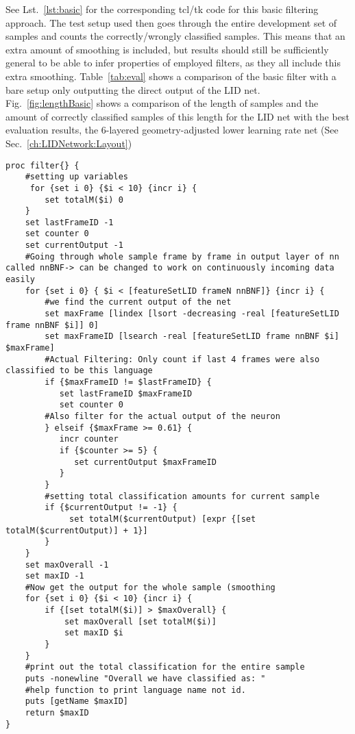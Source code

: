 See Lst.~\ref{lst:basic} for the corresponding tcl/tk code for this basic filtering approach. The test setup used then goes through the entire development set of samples and counts the correctly/wrongly classified samples. This means that an extra amount of smoothing is included, but results should still be sufficiently general to be able to infer properties of employed filters, as they all include this extra smoothing. Table~\ref{tab:eval} shows a comparison of the basic filter with a bare setup only outputting the direct output of the LID net. Fig.~\ref{fig:lengthBasic} shows a comparison of the length of samples and the amount of correctly classified samples of this length for the LID net with the best evaluation results, the 6-layered geometry-adjusted lower learning rate net (See Sec.~\ref{ch:LIDNetwork:Layout}) 
\begin{lstlisting}[label=lst:basic,caption=Most basic filter employed to smooth output]
proc filter{} {
    #setting up variables
     for {set i 0} {$i < 10} {incr i} {
        set totalM($i) 0
    }
    set lastFrameID -1
    set counter 0
    set currentOutput -1
    #Going through whole sample frame by frame in output layer of nn called nnBNF-> can be changed to work on continuously incoming data easily
    for {set i 0} { $i < [featureSetLID frameN nnBNF]} {incr i} {
        #we find the current output of the net
        set maxFrame [lindex [lsort -decreasing -real [featureSetLID frame nnBNF $i]] 0]
        set maxFrameID [lsearch -real [featureSetLID frame nnBNF $i] $maxFrame]
        #Actual Filtering: Only count if last 4 frames were also classified to be this language
        if {$maxFrameID != $lastFrameID} {
           set lastFrameID $maxFrameID
           set counter 0
        #Also filter for the actual output of the neuron
        } elseif {$maxFrame >= 0.61} {
           incr counter
           if {$counter >= 5} {
              set currentOutput $maxFrameID
           }
        }
        #setting total classification amounts for current sample
        if {$currentOutput != -1} {
             set totalM($currentOutput) [expr {[set totalM($currentOutput)] + 1}]
        }
    }
    set maxOverall -1
    set maxID -1
    #Now get the output for the whole sample (smoothing
    for {set i 0} {$i < 10} {incr i} {
        if {[set totalM($i)] > $maxOverall} {
            set maxOverall [set totalM($i)]
            set maxID $i
        }
    }
    #print out the total classification for the entire sample
    puts -nonewline "Overall we have classified as: "
    #help function to print language name not id.
    puts [getName $maxID]
    return $maxID
}

\end{lstlisting}


